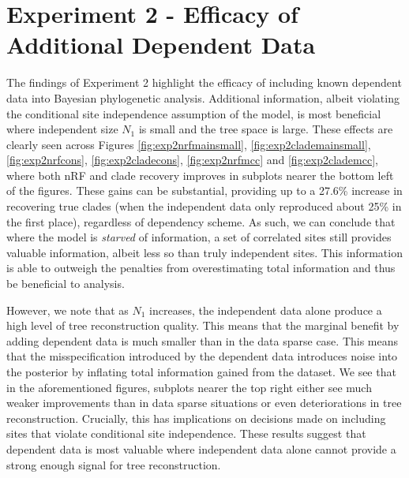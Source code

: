 \section{Experiment 2 - Efficacy of Additional Dependent Data}
\label{sec:discussionexp2}
The findings of Experiment 2 highlight the efficacy of including known dependent data into Bayesian phylogenetic analysis. Additional information, albeit violating the conditional site independence assumption of the model, is most beneficial where independent size $N_1$ is small and the tree space is large. These effects are clearly seen across Figures \ref{fig:exp2nrfmainsmall}, \ref{fig:exp2clademainsmall}, \ref{fig:exp2nrfcons}, \ref{fig:exp2cladecons}, \ref{fig:exp2nrfmcc} and \ref{fig:exp2clademcc}, where both nRF and clade recovery improves in subplots nearer the bottom left of the figures. These gains can be substantial, providing up to a 27.6\% increase in recovering true clades (when the independent data only reproduced about 25\% in the first place), regardless of dependency scheme. As such, we can conclude that where the model is \textit{starved} of information, a set of correlated sites still provides valuable information, albeit less so than truly independent sites. This information is able to outweigh the penalties from overestimating total information and thus be beneficial to analysis.

However, we note that as $N_1$ increases, the independent data alone produce a high level of tree reconstruction quality. This means that the marginal benefit by adding dependent data is much smaller than in the data sparse case. This means that the misspecification introduced by the dependent data introduces noise into the posterior by inflating total information gained from the dataset. We see that in the aforementioned figures, subplots nearer the top right either see much weaker improvements than in data sparse situations or even deteriorations in tree reconstruction. Crucially, this has implications on decisions made on including sites that violate conditional site independence. These results suggest that dependent data is most valuable where independent data alone cannot provide a strong enough signal for tree reconstruction.

